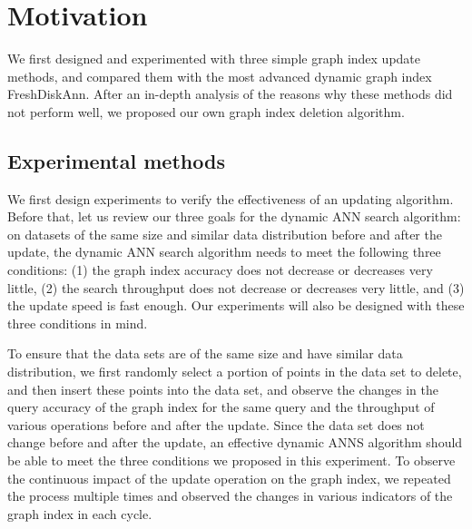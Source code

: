 \section{Motivation}\label{sec:motivation}
We first designed and experimented with three simple graph index update methods, and compared them with the most advanced dynamic graph index FreshDiskAnn\cite{DBLP:journals/corr/abs-2105-09613}. After an in-depth analysis of the reasons why these methods did not perform well, we proposed our own graph index deletion algorithm.
\subsection{Experimental methods}
We first design experiments to verify the effectiveness of an updating algorithm. Before that, let us review our three goals for the dynamic ANN search algorithm: on datasets of the same size and similar data distribution before and after the update, the dynamic ANN search algorithm needs to meet the following three conditions: (1) the graph index accuracy does not decrease or decreases very little, (2) the search throughput does not decrease or decreases very little, and (3) the update speed is fast enough. Our experiments will also be designed with these three conditions in mind.

To ensure that the data sets are of the same size and have similar data distribution, we first randomly select a portion of points in the data set to delete, and then insert these points into the data set, and observe the changes in the query accuracy of the graph index for the same query and the throughput of various operations before and after the update. Since the data set does not change before and after the update, an effective dynamic ANNS algorithm should be able to meet the three conditions we proposed in this experiment. To observe the continuous impact of the update operation on the graph index, we repeated the process multiple times and observed the changes in various indicators of the graph index in each cycle.

